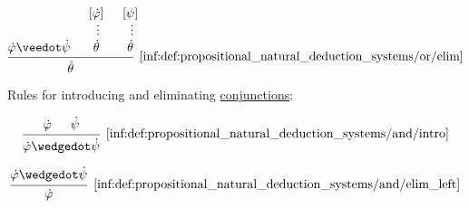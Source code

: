 \begin{definition}
\begin{thmenum}
\begin{paracol}{3}
      \begin{nthcolumn}{2}
        \leavevmode\vfill
        \begin{equation*}\taglabel[\ensuremath{ \vee^- }]{inf:def:propositional_natural_deduction_systems/or/elim}
          \begin{prooftree}
            \hypo{ \syn\varphi \synvee \syn\psi }
            \hypo{ [\syn\varphi] }
            \ellipsis {} { \syn\theta }
            \hypo{ [\psi] }
            \ellipsis {} { \syn\theta }
            \infer3[\ref{inf:def:propositional_natural_deduction_systems/or/elim}]{ \syn\theta }
          \end{prooftree}
        \end{equation*}
      \end{nthcolumn}
    \end{paracol}

     Rules for introducing and eliminating \hyperref[def:propositional_alphabet/connectives/conjunction]{conjunctions}:
    \begin{paracol}{3}
      \begin{nthcolumn}{0}
        \leavevmode\vfill
        \begin{equation*}\taglabel[\ensuremath{ \wedge^+ }]{inf:def:propositional_natural_deduction_systems/and/intro}
          \begin{prooftree}
            \hypo{ \syn\varphi }
            \hypo{ \syn\psi }
            \infer2[\ref{inf:def:propositional_natural_deduction_systems/and/intro}]{ \syn\varphi \synwedge \syn\psi }
          \end{prooftree}
        \end{equation*}
      \end{nthcolumn}

      \begin{nthcolumn}{1}
        \leavevmode\vfill
        \begin{equation*}\taglabel[\ensuremath{ \wedge^{-_L} }]{inf:def:propositional_natural_deduction_systems/and/elim_left}
          \begin{prooftree}
            \hypo{ \syn\varphi \synwedge \syn\psi }
            \infer1[\ref{inf:def:propositional_natural_deduction_systems/and/elim_left}]{ \syn\varphi }
          \end{prooftree}
        \end{equation*}
      \end{nthcolumn}


\end{paracol}
\end{thmenum}
\end{definition}
